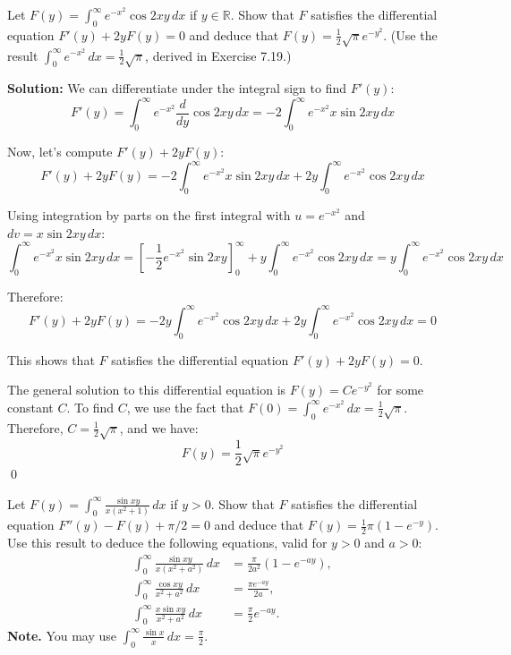 \begin{problembox}
Let $F(y) = \int_{0}^{\infty} e^{-x^2} \cos 2xy \, dx$ if $y \in \mathbb{R}$. Show that $F$ satisfies the differential equation $F'(y) + 2y F(y) = 0$ and deduce that $F(y) = \frac{1}{2} \sqrt{\pi} e^{-y^2}$. (Use the result $\int_{0}^{\infty} e^{-x^2} \, dx = \frac{1}{2} \sqrt{\pi}$, derived in Exercise 7.19.)
\end{problembox}

\bigskip\noindent\textbf{Solution:}
We can differentiate under the integral sign to find $F'(y)$:
\[F'(y) = \int_{0}^{\infty} e^{-x^2} \frac{d}{dy} \cos 2xy \, dx = -2 \int_{0}^{\infty} e^{-x^2} x \sin 2xy \, dx\]

Now, let's compute $F'(y) + 2y F(y)$:
\[F'(y) + 2y F(y) = -2 \int_{0}^{\infty} e^{-x^2} x \sin 2xy \, dx + 2y \int_{0}^{\infty} e^{-x^2} \cos 2xy \, dx\]

Using integration by parts on the first integral with $u = e^{-x^2}$ and $dv = x \sin 2xy \, dx$:
\[\int_{0}^{\infty} e^{-x^2} x \sin 2xy \, dx = \left[-\frac{1}{2} e^{-x^2} \sin 2xy\right]_{0}^{\infty} + y \int_{0}^{\infty} e^{-x^2} \cos 2xy \, dx = y \int_{0}^{\infty} e^{-x^2} \cos 2xy \, dx\]

Therefore:
\[F'(y) + 2y F(y) = -2y \int_{0}^{\infty} e^{-x^2} \cos 2xy \, dx + 2y \int_{0}^{\infty} e^{-x^2} \cos 2xy \, dx = 0\]

This shows that $F$ satisfies the differential equation $F'(y) + 2y F(y) = 0$.

The general solution to this differential equation is $F(y) = C e^{-y^2}$ for some constant $C$. To find $C$, we use the fact that $F(0) = \int_{0}^{\infty} e^{-x^2} \, dx = \frac{1}{2} \sqrt{\pi}$. Therefore, $C = \frac{1}{2} \sqrt{\pi}$, and we have:
\[F(y) = \frac{1}{2} \sqrt{\pi} e^{-y^2}\]\qed


\begin{problembox}
Let $F(y) = \int_{0}^{\infty} \frac{\sin xy}{x(x^2 + 1)} \, dx$ if $y > 0$. Show that $F$ satisfies the differential equation $F''(y) - F(y) + \pi / 2 = 0$ and deduce that $F(y) = \frac{1}{2} \pi (1 - e^{-y})$. Use this result to deduce the following equations, valid for $y > 0$ and $a > 0$:
\begin{align*}
\int_{0}^{\infty} \frac{\sin xy}{x(x^2 + a^2)} \, dx &= \frac{\pi}{2a^2} (1 - e^{-ay}), \\
\int_{0}^{\infty} \frac{\cos xy}{x^2 + a^2} \, dx &= \frac{\pi e^{-ay}}{2a}, \\
\int_{0}^{\infty} \frac{x \sin xy}{x^2 + a^2} \, dx &= \frac{\pi}{2} e^{-ay}.
\end{align*}
\textbf{Note.} You may use $\int_{0}^{\infty} \frac{\sin x}{x} \, dx = \frac{\pi}{2}.$
\end{problembox}

